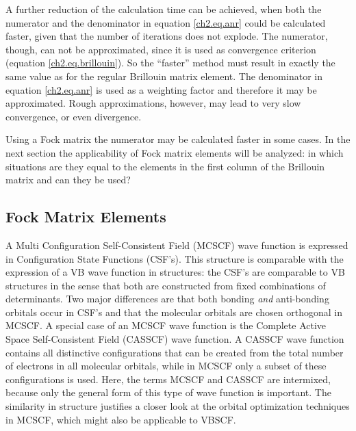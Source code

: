 A further reduction of the calculation time can be achieved, when both the numerator and the denominator in equation \ref{ch2.eq.anr} could be calculated faster, given that the number of iterations does not explode. The numerator, though, can not be approximated, since it is used as convergence criterion (equation \ref{ch2.eq.brillouin}). So the ``faster'' method must result in exactly the same value as for the regular Brillouin matrix element. The denominator in equation \ref{ch2.eq.anr} is used as a weighting factor and therefore it may be approximated. Rough approximations, however, may lead to very slow convergence, or even divergence. 

Using a Fock matrix the numerator may be calculated faster in some cases. In the next section the applicability of Fock matrix elements will be analyzed: in which situations are they equal to the elements in the first column of the Brillouin matrix and can they be used?

\subsection{\label{ch2.sec.fock}Fock Matrix Elements} 

A Multi Configuration Self-Consistent Field (MCSCF) \cite{wahldasbook,daswahl} wave function is expressed in Configuration State Functions (CSF's). This structure is comparable with the expression of a VB wave function in structures: the CSF's are comparable to VB structures in the sense that both are constructed from fixed combinations of determinants. Two major differences are that both bonding \textit{and} anti-bonding orbitals occur in CSF's and that the molecular orbitals are chosen orthogonal in MCSCF. A special case of an MCSCF wave function is the Complete Active Space Self-Consistent Field (CASSCF) wave function. A CASSCF wave function contains all distinctive configurations that can be created from the total number of electrons in all molecular orbitals, while in MCSCF only a subset of these configurations is used. Here, the terms MCSCF and CASSCF are intermixed, because only the general form of this type of wave function is important. The similarity in structure justifies a closer look at the orbital optimization techniques in MCSCF, which might also be applicable to VBSCF.

